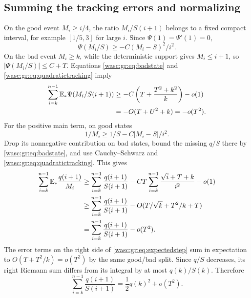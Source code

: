 \documentclass[11pt,a4paper]{article}
\theoremstyle{remark}\newtheorem{remark}[theorem]{Remark}
\numberwithin{equation}{section}
\begin{document}
\subsection{Summing the tracking errors and normalizing}
On the good event $M_i\ge i/4$, the ratio $M_i/S(i+1)$ belongs to a fixed compact interval, for example $[1/5,3]$ for large $i$. Since $\Psi(1)=\Psi'(1)=0$,
\[
\Psi(M_i/S)\ge-C(M_i-S)^2/i^2.
\]
On the bad event $M_i\ge k$, while the deterministic support gives $M_i\le i+1$, so $|\Psi(M_i/S)|\le C+T$. Equations \eqref{wasc:gr:eq:badstate} and \eqref{wasc:gr:eq:quadratictracking} imply
\begin{align}\label{wasc:gr:eq:psitotal}
\sum_{i=k}^{n-1}\mathbb E_*\Psi(M_i/S(i+1))
&\ge-C\left(T+\frac{T^2+k^2}{k}\right)-o(1)\notag\\
&=-O(T+U^2+k)=-o(T^2).
\end{align}
For the positive main term, on good states
\[
1/M_i\ge1/S-C|M_i-S|/i^2.
\]
Drop its nonnegative contribution on bad states, bound the missing $q/S$ there by \eqref{wasc:gr:eq:badstate}, and use Cauchy--Schwarz and \eqref{wasc:gr:eq:quadratictracking}. This gives
\begin{align}\label{wasc:gr:eq:qMtotal}
\sum_{i=k}^{n-1}\mathbb E_*\frac{q(i+1)}{M_i}
&\ge\sum_{i=k}^{n-1}\frac{q(i+1)}{S(i+1)}
-CT\sum_{i=k}^{n-1}\frac{\sqrt i+T+k}{i^2}-o(1)\notag\\
&\ge\sum_{i=k}^{n-1}\frac{q(i+1)}{S(i+1)}
-O(T/\sqrt k+T^2/k+T)\notag\\
&=\sum_{i=k}^{n-1}\frac{q(i+1)}{S(i+1)}-o(T^2).
\end{align}
The error terms on the right side of \eqref{wasc:gr:eq:expectedstep} sum in expectation to $O(T+T^2/k)=o(T^2)$ by the same good/bad split. Since $q/S$ decreases, its right Riemann sum differs from its integral by at most $q(k)/S(k)$. Therefore
\begin{equation}\label{wasc:gr:eq:lowerriemann}
\sum_{i=k}^{n-1}\frac{q(i+1)}{S(i+1)}
=\frac12q(k)^2+o(T^2).
\end{equation}
\end{document}
